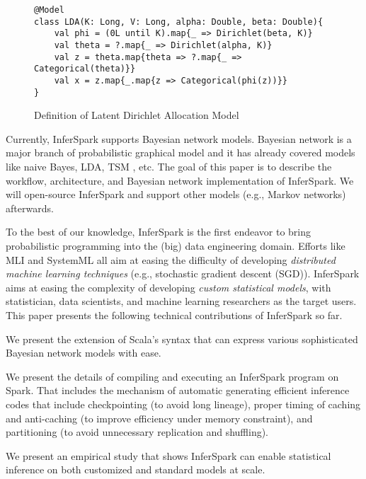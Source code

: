 \begin{figure}
\begin{lstlisting}
@Model
class LDA(K: Long, V: Long, alpha: Double, beta: Double){
	val phi = (0L until K).map{_ => Dirichlet(beta, K)}
	val theta = ?.map{_ => Dirichlet(alpha, K)}
	val z = theta.map{theta => ?.map{_ => Categorical(theta)}}
	val x = z.map{_.map{z => Categorical(phi(z))}}
}
\end{lstlisting}
\label{fig:intro_lda_def}
\caption{Definition of Latent Dirichlet Allocation Model}
\end{figure}

Currently, InferSpark supports Bayesian network models. Bayesian network
is a major branch of probabilistic graphical model and it has already covered
models like naive Bayes, LDA, TSM \cite{tsm}, etc.  The goal of this paper is to
describe the workflow, architecture, and Bayesian network implementation of
InferSpark.  We will open-source InferSpark and support other models (e.g.,
Markov networks) afterwards.  

To the best of our knowledge, InferSpark is the first endeavor to bring 
probabilistic programming into the (big) data engineering domain.
Efforts like MLI \cite{mli} and SystemML \cite{systemml} all aim 
at easing the difficulty of developing \emph{distributed machine learning techniques} 
(e.g., stochastic gradient descent (SGD)).
InferSpark aims at easing the complexity of developing \emph{custom statistical models}, 
with statistician, data scientists, and machine learning researchers as the target users.
This paper presents the following technical contributions of InferSpark so far.
\begin{packed_enum}
\item We present the extension of Scala's syntax that can express various sophisticated 
Bayesian network models with ease.
\item We present the details of compiling and executing an InferSpark program on Spark.
That includes the mechanism of automatic generating efficient inference codes that 
include checkpointing (to avoid long lineage), proper timing of caching and 
anti-caching (to improve efficiency under memory constraint),
 and partitioning (to avoid unnecessary replication and shuffling).
\item We present an empirical study that shows InferSpark can enable 
statistical inference on both customized and standard models at scale.
\end{packed_enum}

